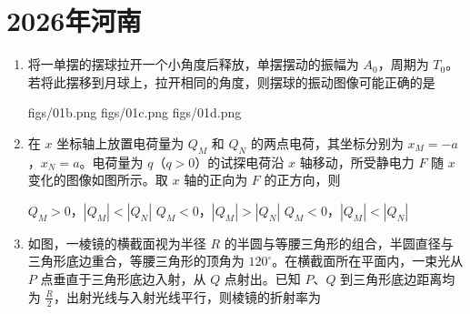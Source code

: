 \documentclass[\gkver]{gaokaozhenti}
\begin{document}
\chapter{2026年河南}

\begin{enumerate}
\item
将一单摆的摆球拉开一个小角度后释放，单摆摆动的振幅为 $A_{0}$，周期为 $T_{0}$。若将此摆移到月球上，拉开相同的角度，则摆球的振动图像可能正确的是 

{figs/01b.png}
{figs/01c.png}
{figs/01d.png}


\item
在 $x$ 坐标轴上放置电荷量为 $Q_{M}$ 和 $Q_{N}$ 的两点电荷，其坐标分别为 $x_{M}= -a$，$x_{N}=a$。电荷量为 $q$（$q>0$）的试探电荷沿 $x$ 轴移动，所受静电力 $F$ 随 $x$ 变化的图像如图所示。取 $x$ 轴的正向为 $F$ 的正方向，则 
\onepicture[w=4.5cm]{}

{$Q_{M}>0$，$|Q_{M}|<|Q_{N}|$}
{$Q_{M}<0$，$|Q_{M}|>|Q_{N}|$}
{$Q_{M}<0$，$|Q_{M}|<|Q_{N}|$}


\item
如图，一棱镜的横截面视为半径 $R$ 的半圆与等腰三角形的组合，半圆直径与三角形底边重合，等腰三角形的顶角为 $120^{\circ}$。在横截面所在平面内，一束光从 $P$ 点垂直于三角形底边入射，从 $Q$ 点射出。已知 $P$、$Q$ 到三角形底边距离均为 $\frac{R}{2}$，出射光线与入射光线平行，则棱镜的折射率为 


\end{enumerate}
\end{document}
